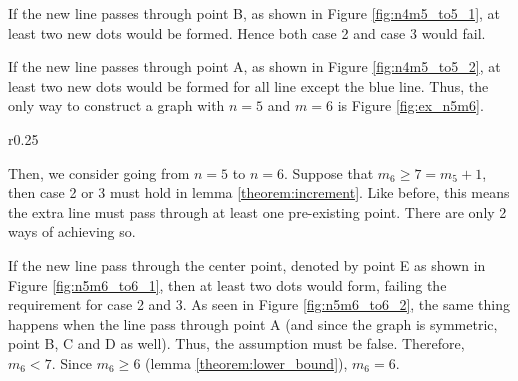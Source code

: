 \documentclass[a4paper, 12pt]{article}
\begin{document}
\begin{appendices}
If the new line passes through point B, as shown in Figure \ref{fig:n4m5_to5_1}, at least two new dots would be formed. Hence both case 2 and case 3 would fail.

If the new line passes through point A, as shown in Figure \ref{fig:n4m5_to5_2}, at least two new dots would be formed for all line except the blue line. Thus, the only way to construct a graph with $n=5$ and $m=6$ is Figure \ref{fig:ex_n5m6}.

\begin{wrapfigure}{r}{0.25\textwidth}
    \vspace{-1\baselineskip}
    
    \caption{If the extra line passes through point E.}
    \label{fig:n5m6_to6_1}
    
    \caption{If the extra line passes through point A.}
    \label{fig:n5m6_to6_2}
\end{wrapfigure}
Then, we consider going from $n=5$ to $n=6$. Suppose that $m_6\geq7=m_5+1$, then case 2 or 3 must hold in lemma \ref{theorem:increment}. Like before, this means the extra line must pass through at least one pre-existing point. There are only 2 ways of achieving so.

If the new line pass through the center point, denoted by point E as shown in Figure \ref{fig:n5m6_to6_1}, then at least two dots would form, failing the requirement for case 2 and 3. As seen in Figure \ref{fig:n5m6_to6_2}, the same thing happens when the line pass through point A (and since the graph is symmetric, point B, C and D as well). Thus, the assumption must be false. Therefore, $m_6<7$. Since $m_6\geq6$ (lemma \ref{theorem:lower_bound}), $m_6=6$.

\null %
\end{appendices}
\end{document}
